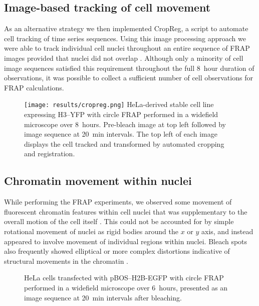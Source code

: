     \subsection{Image-based tracking of cell movement}

    As an alternative strategy we then implemented CropReg, a script 
    to automate cell tracking of time series sequences.
    Using this image processing approach we were able to track individual cell nuclei
    throughout an entire sequence of FRAP images
    provided that nuclei did not overlap .
    Although only a minority of cell image sequences satisfied this requirement
    throughout the full 8~hour duration of observations,
    it was possible to collect a sufficient number of cell observations for FRAP calculations.

    \begin{figure}
      \centering
      \texttt{[image: results/cropreg.png]}
        {
         HeLa-derived stable cell line expressing H3--YFP
         with circle FRAP performed in a widefield microscope over 8~hours.
         Pre-bleach image at top left followed by image sequence at 20~min intervals.
         The top left of each image displays the cell tracked and transformed
         by automated cropping and registration.
        }
      \label{fig:kill-frap:cropreg}
    \end{figure}

  \subsection{Chromatin movement within nuclei}

    While performing the FRAP experiments, we observed some movement of fluorescent chromatin features
    within cell nuclei that was supplementary to the overall motion of the cell itself .
    This could not be accounted for by simple rotational movement of nuclei
    as rigid bodies around the $x$ or $y$ axis, 
    and instead appeared to involve movement of individual regions within nuclei.
    Bleach spots also frequently showed elliptical or more complex distortions
    indicative of structural movements in the chromatin .

    \begin{figure}
      \centering
        {HeLa cells transfected with pBOS--H2B-EGFP with circle FRAP performed 
        in a widefield microscope over 6~hours, presented as an image sequence 
        at 20~min intervals after bleaching.}
      \label{fig:kill-frap:frap-spot-movement}
    \end{figure}

